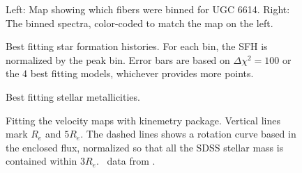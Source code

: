 \documentclass[12pt,preprint]{aastex}
\newcommand\HI{\ion{H}{1}}
\begin{document}


\begin{figure}
\caption{Left:  Map showing which fibers were binned for UGC 6614.  Right:  The binned spectra, color-coded to match the map on the left. \label{ugc_binmap}}
\end{figure}




\begin{figure}
\caption{ Best fitting star formation histories.  For each bin, the SFH is normalized by the peak bin.  Error bars are based on $\Delta\chi^2=100$ or the 4 best fitting models, whichever provides more points.  \label{sfh_ugc} }
\end{figure}


\begin{figure}
\caption{Best fitting stellar metallicities.   \label{metal_ugc}}
\end{figure}


\begin{figure}
\caption{Fitting the velocity maps with kinemetry package. Vertical lines mark $R_e$ and $5R_e$.  The dashed lines shows a rotation curve based in the enclosed flux, normalized so that all the SDSS stellar mass is contained within $3R_e$.  \HI\ data from \citet{Pickering97}.\label{ugc_kinem}}
\end{figure}
\end{document}
